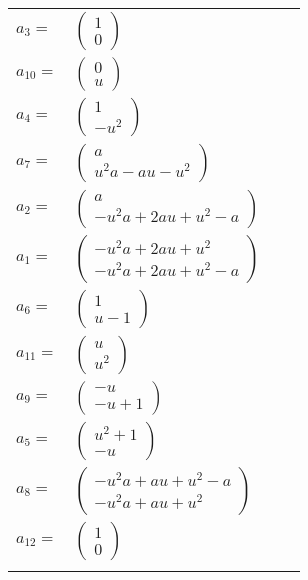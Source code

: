 \documentclass[1p]{elsarticle_modified}
\theoremstyle{definition}
\begin{document}
\begin{tabular}{m{7pt} m{180pt} m{7pt} m{180pt} }
\flushright $a_{3}=$&$\begin{pmatrix}1\\0\end{pmatrix}$ \\
\flushright $a_{10}=$&$\begin{pmatrix}0\\u\end{pmatrix}$ \\
\flushright $a_{4}=$&$\begin{pmatrix}1\\- u^2\end{pmatrix}$ \\
\flushright $a_{7}=$&$\begin{pmatrix}a\\u^2 a- a u- u^2\end{pmatrix}$ \\
\flushright $a_{2}=$&$\begin{pmatrix}a\\- u^2 a+2 a u+u^2- a\end{pmatrix}$ \\
\flushright $a_{1}=$&$\begin{pmatrix}- u^2 a+2 a u+u^2\\- u^2 a+2 a u+u^2- a\end{pmatrix}$ \\
\flushright $a_{6}=$&$\begin{pmatrix}1\\u-1\end{pmatrix}$ \\
\flushright $a_{11}=$&$\begin{pmatrix}u\\u^2\end{pmatrix}$ \\
\flushright $a_{9}=$&$\begin{pmatrix}- u\\- u+1\end{pmatrix}$ \\
\flushright $a_{5}=$&$\begin{pmatrix}u^2+1\\- u\end{pmatrix}$ \\
\flushright $a_{8}=$&$\begin{pmatrix}- u^2 a+a u+u^2- a\\- u^2 a+a u+u^2\end{pmatrix}$ \\
\flushright $a_{12}=$&$\begin{pmatrix}1\\0\end{pmatrix}$\\&\end{tabular}
\end{document}
